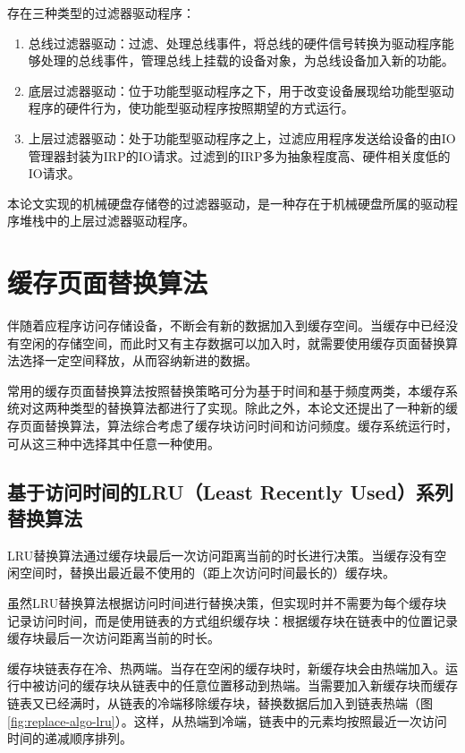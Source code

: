 存在三种类型的过滤器驱动程序：

\begin{enumerate}
\item
总线过滤器驱动：过滤、处理总线事件，将总线的硬件信号转换为驱动程序能够处理的总线事件，管理总线上挂载的设备对象，为总线设备加入新的功能。
\item
底层过滤器驱动：位于功能型驱动程序之下，用于改变设备展现给功能型驱动程序的硬件行为，使功能型驱动程序按照期望的方式运行。
\item
上层过滤器驱动：处于功能型驱动程序之上，过滤应用程序发送给设备的由IO管理器封装为IRP的IO请求。过滤到的IRP多为抽象程度高、硬件相关度低的IO请求。
\end{enumerate}

本论文实现的机械硬盘存储卷的过滤器驱动，是一种存在于机械硬盘所属的驱动程序堆栈中的上层过滤器驱动程序。

\section{缓存页面替换算法}
\label{sec:cache_algorithm}

伴随着应程序访问存储设备，不断会有新的数据加入到缓存空间。当缓存中已经没有空闲的存储空间，而此时又有主存数据可以加入时，就需要使用缓存页面替换算法选择一定空间释放，从而容纳新进的数据。

常用的缓存页面替换算法按照替换策略可分为基于时间和基于频度两类，本缓存系统对这两种类型的替换算法都进行了实现。除此之外，本论文还提出了一种新的缓存页面替换算法，算法综合考虑了缓存块访问时间和访问频度。缓存系统运行时，可从这三种中选择其中任意一种使用。

\subsection{基于访问时间的LRU（Least Recently Used）系列替换算法}

LRU替换算法\cite{LRU}通过缓存块最后一次访问距离当前的时长进行决策。当缓存没有空闲空间时，替换出最近最不使用的（距上次访问时间最长的）缓存块。

虽然LRU替换算法根据访问时间进行替换决策，但实现时并不需要为每个缓存块记录访问时间，而是使用链表的方式组织缓存块：根据缓存块在链表中的位置记录缓存块最后一次访问距离当前的时长。

缓存块链表存在冷、热两端。当存在空闲的缓存块时，新缓存块会由热端加入。运行中被访问的缓存块从链表中的任意位置移动到热端。当需要加入新缓存块而缓存链表又已经满时，从链表的冷端移除缓存块，替换数据后加入到链表热端（图\ref{fig:replace-algo-lru}）。这样，从热端到冷端，链表中的元素均按照最近一次访问时间的递减顺序排列。

